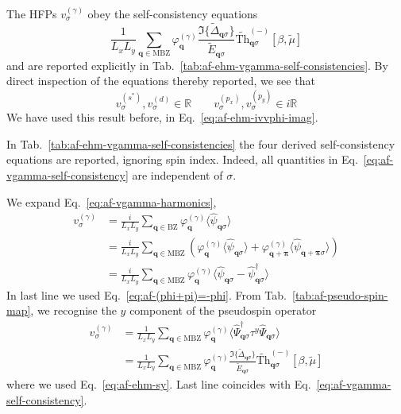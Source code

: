 The HFPs $v_\sigma^{(\gamma)}$ obey the self-consistency equations
\begin{equation}\label{eq:af-vgamma-self-consistency}
	\frac{1}{L_x L_y} \sum_{\mathbf{q}\in\mathrm{MBZ}} \varphi_\mathbf{q}^{(\gamma)}
	\frac{\Im\lbrace\tilde{\Delta}_{\mathbf{q}\sigma}\rbrace}{\tilde{E}_{\mathbf{q}\sigma}} \tilde{\mathrm{Th}}_{\mathbf{q}\sigma}^{(-)}[\beta,\tilde{\mu}]
\end{equation}
and are reported explicitly in Tab.~\ref{tab:af-ehm-vgamma-self-consistencies}. By direct inspection of the equations thereby reported, we see that
\begin{equation}\label{eq:af-v-Re-iRe}
	v^{(s^*)}_\sigma, v^{(d)}_\sigma \in \mathbb{R}
	\qquad
	v^{(p_x)}_\sigma, v^{(p_y)}_\sigma \in i\mathbb{R}
\end{equation}
We have used this result before, in Eq.~\eqref{eq:af-ehm-ivvphi-imag}. 

In Tab.~\ref{tab:af-ehm-vgamma-self-consistencies} the four derived self-consistency equations are reported, ignoring spin index. Indeed, all quantities in Eq.~\eqref{eq:af-vgamma-self-consistency} are independent of $\sigma$.

\begin{tabproof}
	
	We expand Eq.~\eqref{eq:af-vgamma-harmonics},
	\[
	\begin{aligned}
		v^{(\gamma)}_\sigma &= \frac{i}{L_x L_y} \sum_{\mathbf{q}\in\mathrm{BZ}} \varphi_\mathbf{q}^{(\gamma)}
		\langle
		\hat \psi_{\mathbf{q}\sigma}
		\rangle \\
		&= \frac{i}{L_x L_y} \sum_{\mathbf{q}\in\mathrm{MBZ}} \left(
		\varphi_\mathbf{q}^{(\gamma)}
		\langle
		\hat \psi_{\mathbf{q}\sigma}
		\rangle
		+
		\varphi_{\mathbf{q}+\bm{\pi}}^{(\gamma)}
		\langle
		\hat \psi_{\mathbf{q}+\bm{\pi}\sigma}
		\rangle
		\right) \\
		&= \frac{i}{L_x L_y} \sum_{\mathbf{q}\in\mathrm{MBZ}} \varphi_\mathbf{q}^{(\gamma)}
		\langle
		\hat \psi_{\mathbf{q}\sigma} -
		\hat \psi_{\mathbf{q}\sigma}^\dagger
		\rangle
	\end{aligned}
	\]
	In last line we used Eq.~\eqref{eq:af-(phi+pi)=-phi}. From Tab.~\ref{tab:af-pseudo-spin-map}, we recognise the $y$ component of the pseudospin operator
	\begin{align}
		v^{(\gamma)}_\sigma &= \frac{1}{L_x L_y} \sum_{\mathbf{q}\in\mathrm{MBZ}} \varphi_\mathbf{q}^{(\gamma)}
		\langle
		\hat \Psi_{\mathbf{q}\sigma}^\dagger \tau^y \hat \Psi_{\mathbf{q}\sigma}
		\rangle \nonumber \\
		&= \frac{1}{L_x L_y} \sum_{\mathbf{q}\in\mathrm{MBZ}} \varphi_\mathbf{q}^{(\gamma)}
		\frac{\Im\lbrace\tilde{\Delta}_{\mathbf{q}\sigma}\rbrace}{\tilde{E}_{\mathbf{q}\sigma}} \tilde{\mathrm{Th}}_{\mathbf{q}\sigma}^{(-)}[\beta,\tilde{\mu}] \label{eq:af-vgamma-chain}
	\end{align}
	where we used Eq.~\eqref{eq:af-ehm-sy}. Last line coincides with Eq.~\eqref{eq:af-vgamma-self-consistency}.
\end{tabproof}

